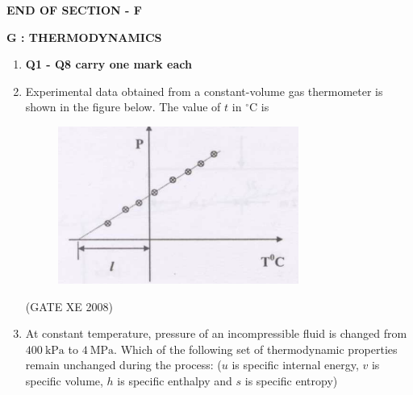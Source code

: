 \documentclass[12pt]{article}
\begin{document}
\begin{center}
    \textbf{END OF SECTION - F}
\end{center}

\newpage

\begin{center}
    \textbf{\Large G : THERMODYNAMICS}
\end{center}

\begin{enumerate}
\item[] \textbf{Q1 - Q8 carry one mark each}

\item Experimental data obtained from a constant-volume gas thermometer is shown in the figure below. The value of $t$ in $^\circ$C is  

    \begin{figure}[H]
    \centering
    \includegraphics[width=0.5\columnwidth]{figs/ass1_g_q1.png}
    \caption{}
    \end{figure}
\begin{enumerate}
\end{enumerate}

(GATE XE 2008)

\item At constant temperature, pressure of an incompressible fluid is changed from $400\ \mathrm{kPa}$ to $4\ \mathrm{MPa}$. Which of the following set of thermodynamic properties remain unchanged during the process: ($u$ is specific internal energy, $v$ is specific volume, $h$ is specific enthalpy and $s$ is specific entropy)  

\begin{enumerate}
\end{enumerate}


\end{enumerate}
\end{document}
